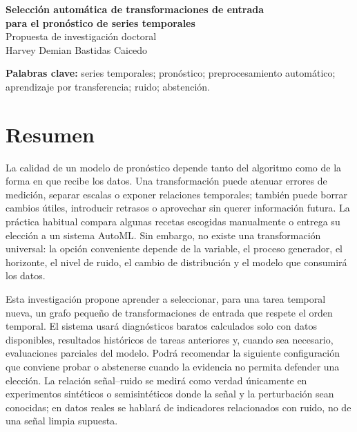 \documentclass[11pt,letterpaper]{article}
\begin{document}
\begin{center}
{\LARGE\bfseries Selección automática de transformaciones de entrada\\[0.15em]
para el pronóstico de series temporales}\\[0.75em]
{\large Propuesta de investigación doctoral}\\[0.35em]
Harvey Demian Bastidas Caicedo
\end{center}

\vspace{0.25em}
\noindent\textbf{Palabras clave:}
series temporales; pronóstico; preprocesamiento automático; aprendizaje por transferencia; ruido; abstención.

\section*{Resumen}

La calidad de un modelo de pronóstico depende tanto del algoritmo como de la forma en que recibe los datos.
Una transformación puede atenuar errores de medición, separar escalas o exponer relaciones temporales; también puede borrar cambios útiles, introducir retrasos o aprovechar sin querer información futura.
La práctica habitual compara algunas recetas escogidas manualmente o entrega su elección a un sistema AutoML.
Sin embargo, no existe una transformación universal: la opción conveniente depende de la variable, el proceso generador, el horizonte, el nivel de ruido, el cambio de distribución y el modelo que consumirá los datos.

Esta investigación propone aprender a seleccionar, para una tarea temporal nueva, un grafo pequeño de transformaciones de entrada que respete el orden temporal.
El sistema usará diagnósticos baratos calculados solo con datos disponibles, resultados históricos de tareas anteriores y, cuando sea necesario, evaluaciones parciales del modelo.
Podrá recomendar la siguiente configuración que conviene probar o abstenerse cuando la evidencia no permita defender una elección.
La relación señal--ruido se medirá como verdad únicamente en experimentos sintéticos o semisintéticos donde la señal y la perturbación sean conocidas; en datos reales se hablará de indicadores relacionados con ruido, no de una señal limpia supuesta.
\end{document}
